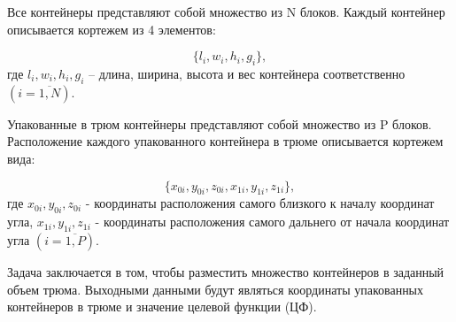 Все контейнеры представляют собой множество из N блоков.
Каждый контейнер описывается кортежем из 4 элементов: 

\begin{equation}
	\label{formula:rtt}
	\{l_{i}, w_{i}, h_{i}, g_{i}\}, 
\end{equation}
где $l_{i}, w_{i}
, h_{i}, g_{i}$ – длина, ширина, высота и вес контейнера соответственно \newline $(i = \overline {1, N})$.

Упакованные в трюм контейнеры представляют собой множество из P блоков.
Расположение каждого упакованного контейнера в трюме описывается кортежем вида: 

\begin{equation}
	\label{formula:rtt}
	\{x_{0i}, y_{0i}, z_{0i}, x_{1i}, y_{1i}, z_{1i}\}, 
\end{equation}
где $x_{0i}, y_{0i}, z_{0i}$ - координаты расположения самого близкого к началу координат угла, $x_{1i}, y_{1i}, z_{1i}$ - координаты расположения самого дальнего от начала координат угла $(i = \overline {1, P})$.

Задача заключается в том, чтобы разместить множество контейнеров в заданный объем трюма. Выходными данными будут являться координаты упакованных контейнеров в трюме и значение целевой функции (ЦФ).

